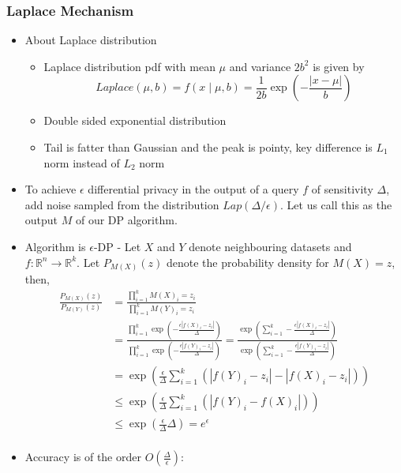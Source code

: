 \documentclass{article}
\begin{document}
\subsubsection{Laplace Mechanism}

\begin{itemize}
    \item About Laplace distribution
        \begin{itemize}
            \item Laplace distribution pdf with mean $\mu$ and variance $2b^2$ is given by
                $$Laplace(\mu,b) = f(x\mid \mu ,b) ={\frac  {1}{2b}}\exp \left(-{\frac  {|x-\mu |}{b}}\right)$$
                \item Double sided exponential distribution
            \item Tail is fatter than Gaussian and the peak is pointy, key difference is $L_1$ norm instead of $L_2$ norm
        \end{itemize}
    \item To achieve $\epsilon$ differential privacy in the output of a query $f$ of sensitivity $\Delta$, add noise sampled from the distribution $Lap(\Delta / \epsilon)$. Let us call this as the output $M$ of our DP algorithm.
    \item Algorithm is $\epsilon$-DP - Let $X$ and $Y$ denote neighbouring datasets and $f: \mathbb{R}^n \to \mathbb{R}^k$. Let $P_{M(X)}(z)$ denote the probability density for $M(X)=z$, then,
        \begin{align*}
            \frac{P_{M(X)}(z)}{P_{M(Y)}(z)} &= \frac{\prod_{i=1}^k M(X)_i=z_i}{\prod_{i=1}^k M(Y)_i=z_i}\\
            &= \frac{\prod_{i=1}^k \exp{(-\frac{\epsilon |f(X)_i - z_i|}{\Delta}) }}{\prod_{i=1}^k \exp{(-\frac{\epsilon |f(Y)_i - z_i|}{\Delta}) }}
            = \frac{ \exp{( \sum_{i=1}^k -\frac{\epsilon |f(X)_i - z_i|}{\Delta}) }}{ \exp{( \sum_{i=1}^k -\frac{\epsilon |f(Y)_i - z_i|}{\Delta}) }}\\
            &= \exp{\left( \frac{\epsilon}{\Delta} \sum_{i=1}^k \left(  |f(Y)_i - z_i| - |f(X)_i - z_i| \right) \right)}\\
            &\leq \exp{\left( \frac{\epsilon}{\Delta} \sum_{i=1}^k \left(  |f(Y)_i - f(X)_i| \right) \right)}\\
            &\leq \exp{ \left(\frac{\epsilon}{\Delta} \Delta\right)} = e^\epsilon\\
        \end{align*}
    \item Accuracy is of the order $O(\frac{\Delta}{\epsilon})$:

\end{itemize}
\end{document}
